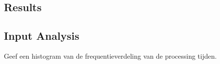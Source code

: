 \documentclass[11pt,a4paper]{article}
\begin{document}
\subsection{Results}

\subsection{Input Analysis}
Geef een histogram van de frequentieverdeling van de processing tijden.



\end{document}
